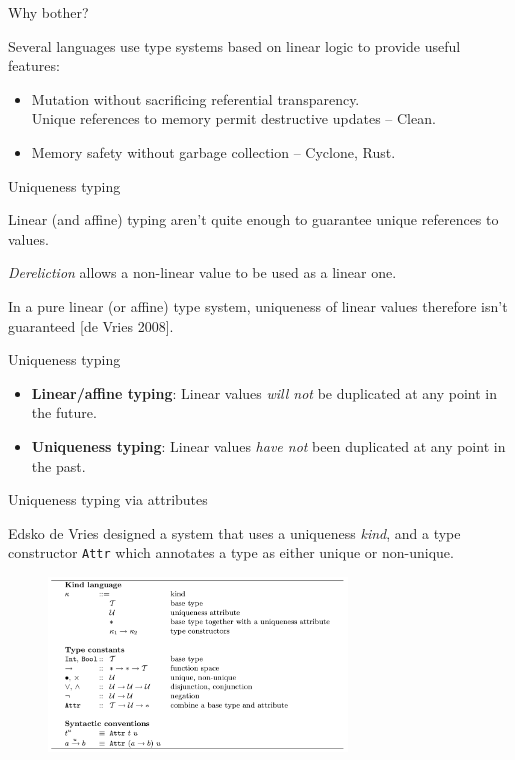 \documentclass[10pt]{beamer}
\begin{document}
\begin{frame}{Why bother?}

Several languages use type systems based on linear logic to provide useful features:

\begin{itemize}
\item Mutation without sacrificing referential transparency.\\
      Unique references to memory permit destructive updates -- Clean.
\item Memory safety without garbage collection -- Cyclone, Rust.
\end{itemize}
\end{frame}

\begin{frame}{Uniqueness typing}

Linear (and affine) typing aren't quite enough to guarantee unique references to values.

\textit{Dereliction} allows a non-linear value to be used as a linear one.

In a pure linear (or affine) type system, uniqueness of linear values therefore isn't guaranteed [de Vries 2008].
\end{frame}

\begin{frame}{Uniqueness typing}

\begin{itemize}
\item \textbf{Linear/affine typing}: Linear values \textit{will not} be duplicated at any point in the future.
\item \textbf{Uniqueness typing}: Linear values \textit{have not} been duplicated at any point in the past.
\end{itemize}

\end{frame}

\begin{frame}{Uniqueness typing via attributes}

Edsko de Vries designed a system that uses a uniqueness \textit{kind}, and a type constructor \texttt{Attr} which annotates a type as either unique or non-unique.

\begin{figure}[h]
\centering
\includegraphics[width=300px]{de_Vries_attributes.png}
\label{}
\end{figure}
\end{frame}
\end{document}
